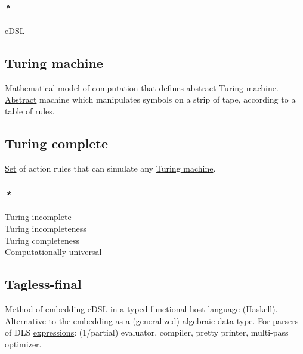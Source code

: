 \documentclass[11pt]{article}
\begin{document}
\paragraph{\emph{*}}
\label{sec:org181bee3}

\label{org6b3479f}eDSL\\

\subsection{\label{org8daa338}Turing machine}
\label{sec:orgb87d1ef}
Mathematical model of computation that defines \hyperref[org606d002]{abstract} \hyperref[org8daa338]{Turing machine}. \hyperref[org606d002]{Abstract} machine which manipulates symbols on a strip of tape, according to a table of rules.\\

\subsection{\label{org8521e4c}Turing complete}
\label{sec:orge449856}

\hyperref[orgbed80ba]{Set} of action rules that can simulate any \hyperref[org8daa338]{Turing machine}.\\

\subsubsection{\emph{*}}
\label{sec:org4ca384b}

\label{org26fe428}Turing incomplete\\
\label{org363120f}Turing incompleteness\\
\label{org41243f8}Turing completeness\\
\label{org451eb78}Computationally universal\\

\subsection{\label{org1b44ab8}Tagless-final}
\label{sec:orgef05b45}
Method of embedding \hyperref[org6b3479f]{eDSL} in a typed functional host language (Haskell). \hyperref[org1636559]{Alternative} to the embedding as a (generalized) \hyperref[orgeba275a]{algebraic data type}. For parsers of DLS \hyperref[org9eb2c72]{expressions}: (1/partial) evaluator, compiler, pretty printer, multi-pass optimizer.\\
\end{document}
